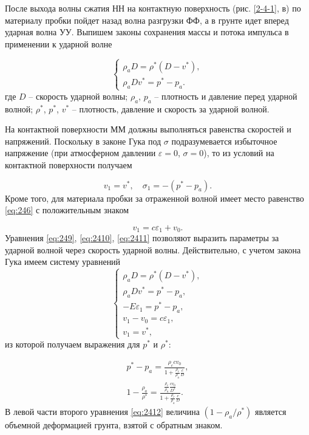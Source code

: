 \documentclass[specialist, subf, href, colorlinks=true, 14pt, final]{disser}
\theoremstyle{definition}
\begin{document}
После выхода волны сжатия НН на контактную поверхность (рис. \ref{2-4-1}, в) по материалу пробки пойдет назад волна разгрузки ФФ, а в грунте идет вперед ударная волна УУ. Выпишем законы сохранения массы и потока импульса в применении к ударной волне
\addtocounter{equation}{1}
\begin{equation}\label{eq:249}
	 \left\{
	 	\begin{array}{l}
	 		\rho_a D = \rho^* (D - v^*), \\
	 		\rho_a D v^* = p^* - p_a.
	 	\end{array}
	 \right.
	\tag{9}
\end{equation}
где $D$ -- скорость ударной волны; $\rho_{a}$, $p_a$ -- плотность и  давление перед ударной волной; $\rho^*$, $p^*$, $v^*$ -- плотность, давление и скорость за ударной волной.

На контактной поверхности ММ должны выполняться равенства скоростей и напряжений. Поскольку в законе Гука под $\sigma$ подразумевается избыточное напряжение (при атмосферном давлении $\varepsilon = 0$, $\sigma = 0$), то из условий на контактной поверхности получаем
\addtocounter{equation}{1}
\begin{equation}\label{eq:2410}
	 v_1 = v^*, \quad \sigma_1 = - (p^* - p_a).
	\tag{10}
\end{equation} 
Кроме того, для материала пробки за отраженной волной имеет место равенство \eqref{eq:246} с положительным знаком
\addtocounter{equation}{1}
\begin{equation}\label{eq:2411}
	 v_1 = c \varepsilon_1 + v_0.
	\tag{11}
\end{equation}
Уравнения \eqref{eq:249}, \eqref{eq:2410}, \eqref{eq:2411} позволяют выразить параметры за ударной волной через скорость ударной волны. Действительно, с учетом закона Гука имеем систему уравнений
\[ 
\left\{
	\begin{array}{l}
		\rho_a D = \rho^* (D - v^*), \\
	 	\rho_a D v^* = p^* - p_a, \\
	 	-E \varepsilon_1 = p^* - p_a,\\
	 	v_1 - v_0 = c \varepsilon_1,\\
	 	v_1 = v^*,	
	\end{array}
\right.	
\]
из которой получаем выражения для $p^*$ и $\rho^*$:
\addtocounter{equation}{1}
\begin{equation}\label{eq:2412}
	 	\begin{array}{l}
	 		p^* - p_a = \displaystyle \frac{\rho_c c v_0}{1 + \displaystyle \frac{\rho_c}{\rho_a} \frac{c}{D}},\\
	 		1 - \displaystyle  \frac{\rho_a}{\rho^*} = \displaystyle \frac{ \displaystyle \frac{\rho_c}{\rho_a} \frac{c v_0}{D^2}}{1+ \displaystyle \frac{\rho_c}{\rho_a} \frac{c}{D}}.
	 	\end{array}
	\tag{12}
\end{equation}
В левой части второго уравнения \eqref{eq:2412} величина $(1 - \rho_a/\rho^*)$ является объемной деформацией грунта, взятой с обратным знаком. 
\end{document}
